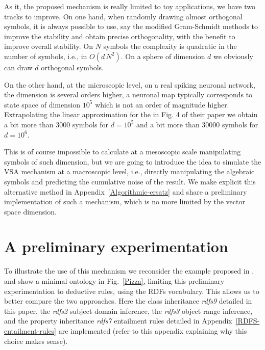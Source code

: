 \documentclass[sn-mathphys]{sn-jnl}
\begin{document}
As it, the proposed mechanism is really limited to toy applications, we have two tracks to improve. On one hand, when randomly drawing almost orthogonal symbols, it is always possible to use, say the modified Gram-Schmidt methods to improve the stability and obtain precise orthogonality, with the benefit to improve overall stability. On $N$ symbols the complexity is quadratic in the number of symbols, i.e., in $O(d\,N^2)$. On a sphere of dimension $d$ we obviously can draw $d$ orthogonal symbols.

On the other hand, at the microscopic level, on a real spiking neuronal network, the dimension is several orders higher, a neuronal map typically corresponds to state space of dimension $10^5$ which is not an order of magnitude higher.  Extrapolating the linear approximation for the \cite{schlegel_comparison_2020} in Fig. 4 of their paper we obtain a bit more than $3000$ symbols for $d=10^5$ and a bit more than $30000$ symbols for $d=10^6$. 

This is of course impossible to calculate at a mesoscopic scale manipulating symbols of such dimension, but we are going to introduce the idea to simulate the VSA mechanism at a macroscopic level, i.e., directly manipulating the algebraic symbols and predicting the cumulative noise of the result. We make explicit this alternative method in Appendix~\ref{Algorithmic-ersatz} and share a preliminary implementation of such a mechanism, which is no more limited by the vector space dimension. 

\section{A preliminary experimentation}

To illustrate the use of this mechanism we reconsider the example proposed in \cite{mercier_ontology_2021}, and show a minimal ontology in Fig.~\ref{Pizza}, limiting this preliminary experimentation to deductive rules, using the RDFs vocabulary. This allows us to better compare the two approaches. Here the class inheritance \textit{rdfs9} detailed in this paper, the \textit{rdfs2} subject domain inference, the \textit{rdfs3} object range inference, and the property inheritance \textit{rdfs7} entailment rules  detailed in Appendix~\ref{RDFS-entailment-rules} are implemented (refer to this appendix explaining why this choice makes sense).
\end{document}
